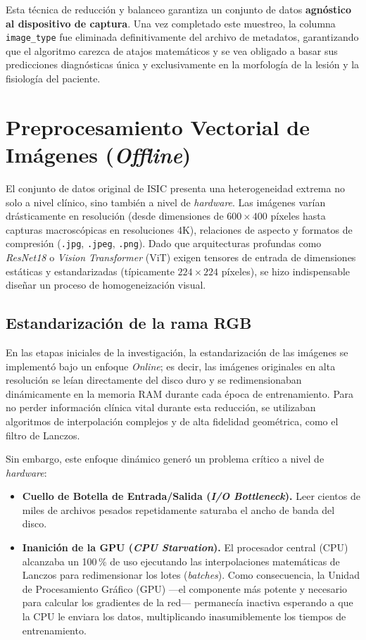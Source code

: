 Esta técnica de reducción y balanceo garantiza un conjunto de datos \textbf{agnóstico al dispositivo de captura}. Una vez completado este muestreo, la columna \texttt{image\_type} fue eliminada definitivamente del archivo de metadatos, garantizando que el algoritmo carezca de atajos matemáticos y se vea obligado a basar sus predicciones diagnósticas única y exclusivamente en la morfología de la lesión y la fisiología del paciente.

\section{Preprocesamiento Vectorial de Imágenes (\textit{Offline})}

El conjunto de datos original de ISIC presenta una heterogeneidad extrema no solo a nivel clínico, sino también a nivel de \textit{hardware}. Las imágenes varían drásticamente en resolución (desde dimensiones de $600 \times 400$ píxeles hasta capturas macroscópicas en resoluciones 4K), relaciones de aspecto y formatos de compresión (\texttt{.jpg}, \texttt{.jpeg}, \texttt{.png}). Dado que arquitecturas profundas como \textit{ResNet18} o \textit{Vision Transformer} (ViT) exigen tensores de entrada de dimensiones estáticas y estandarizadas (típicamente $224 \times 224$ píxeles), se hizo indispensable diseñar un proceso de homogeneización visual.

\subsection{Estandarización de la rama RGB}

En las etapas iniciales de la investigación, la estandarización de las imágenes se implementó bajo un enfoque \textit{Online}; es decir, las imágenes originales en alta resolución se leían directamente del disco duro y se redimensionaban dinámicamente en la memoria RAM durante cada época de entrenamiento. Para no perder información clínica vital durante esta reducción, se utilizaban algoritmos de interpolación complejos y de alta fidelidad geométrica, como el filtro de Lanczos.

Sin embargo, este enfoque dinámico generó un problema crítico a nivel de \textit{hardware}:

\begin{itemize}
	\item \textbf{Cuello de Botella de Entrada/Salida (\textit{I/O Bottleneck}).} Leer cientos de miles de archivos pesados repetidamente saturaba el ancho de banda del disco.
	
	\item \textbf{Inanición de la GPU (\textit{CPU Starvation}).} El procesador central (CPU) alcanzaba un 100\,\% de uso ejecutando las interpolaciones matemáticas de Lanczos para redimensionar los lotes (\textit{batches}). Como consecuencia, la Unidad de Procesamiento Gráfico (GPU) ---el componente más potente y necesario para calcular los gradientes de la red--- permanecía inactiva esperando a que la CPU le enviara los datos, multiplicando inasumiblemente los tiempos de entrenamiento.
\end{itemize}

